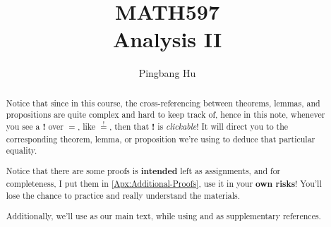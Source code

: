 \documentclass[a4paper]{article}
\author{Pingbang Hu}
\title{MATH597\\Analysis II}
\begin{document}
\maketitle

\begin{abstract}
	Notice that since in this course, the cross-referencing between theorems, lemmas, and propositions are quite complex and
	hard to keep track of, hence in this note, whenever you see a \textbf{!} over \(=\), like \(\overset{!}{=}\), then that
	\textbf{!} is \emph{clickable}! It will direct you to the corresponding theorem, lemma, or proposition we're using to deduce that particular
	equality.

	\par Notice that there are some proofs is \textbf{intended} left as assignments, and for completeness, I put them in \autoref{Apx:Additional-Proofs},
	use it in your \textbf{own risks}! You'll lose the chance to practice and really understand the materials.

	\par Additionally, we'll use \cite{folland1999real} as our main text, while using \cite{tao2013introduction} and \cite{axler2019measure} as supplementary references.
\end{abstract}

\tableofcontents


\newpage
\appendix
\appendixpage



\newpage
\printbibliography
\end{document}
